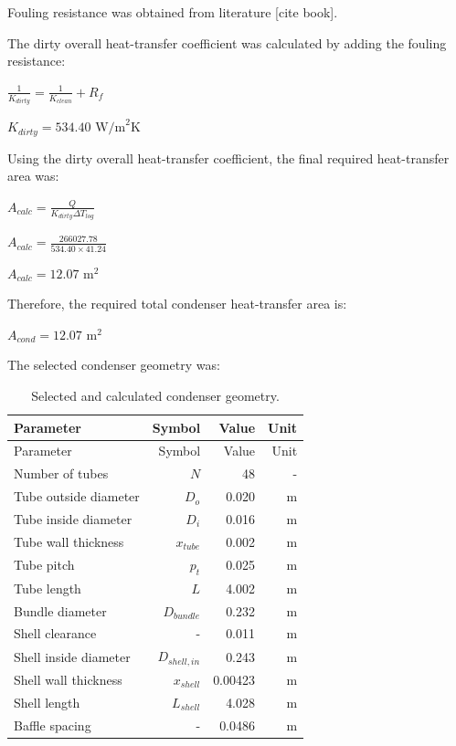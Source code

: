 Fouling resistance was obtained from literature {[}cite book{]}.

The dirty overall heat-transfer coefficient was calculated by adding the
fouling resistance:

\(\frac{1}{K_{dirty}} = \frac{1}{K_{clean}} + R_f\)

\(K_{dirty} = 534.40 \text{ W/m}^2\text{K}\)

Using the dirty overall heat-transfer coefficient, the final required
heat-transfer area was:

\(A_{calc} = \frac{Q}{K_{dirty} \Delta T_{log}}\)

\(A_{calc} = \frac{266027.78}{534.40 \times 41.24}\)

\(A_{calc} = 12.07 \text{ m}^2\)

Therefore, the required total condenser heat-transfer area is:

\(A_{cond} = 12.07 \text{ m}^2\)

The selected condenser geometry was:

\begin{longtable}[]{@{}lrrr@{}}
\caption{Selected and calculated condenser geometry.
\label{tab:Selected and calculated condenser geometry}}\tabularnewline
\toprule\noalign{}
Parameter & Symbol & Value & Unit \\
\midrule\noalign{}
\endfirsthead
\toprule\noalign{}
Parameter & Symbol & Value & Unit \\
\midrule\noalign{}
\endhead
\bottomrule\noalign{}
\endlastfoot
Number of tubes & \(N\) & 48 & - \\
Tube outside diameter & \(D_o\) & 0.020 & m \\
Tube inside diameter & \(D_i\) & 0.016 & m \\
Tube wall thickness & \(x_{tube}\) & 0.002 & m \\
Tube pitch & \(p_t\) & 0.025 & m \\
Tube length & \(L\) & 4.002 & m \\
Bundle diameter & \(D_{bundle}\) & 0.232 & m \\
Shell clearance & - & 0.011 & m \\
Shell inside diameter & \(D_{shell,in}\) & 0.243 & m \\
Shell wall thickness & \(x_{shell}\) & 0.00423 & m \\
Shell length & \(L_{shell}\) & 4.028 & m \\
Baffle spacing & - & 0.0486 & m \\
\end{longtable}

